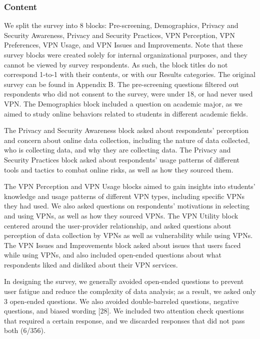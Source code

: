 \subsubsection{Content}

We split the survey into 8 blocks: Pre-screening, Demographics, Privacy and
Security Awareness, Privacy and Security Practices, VPN Perception, VPN
Preferences, VPN Usage, and VPN Issues and Improvements. Note that these
survey blocks were created solely for internal organizational purposes, and
they cannot be viewed by survey respondents. As such, the block titles do not
correspond 1-to-1 with their contents, or with our Results categories. The
original survey can be found in Appendix B.  The pre-screening questions
filtered out respondents who did not consent to the survey, were under 18, or
had never used VPN. The Demographics block included a question on academic
major, as we aimed to study online behaviors related to students in different
academic fields.

The Privacy and Security Awareness block asked about respondents' perception
and concern about online data collection, including the nature of data
collected, who is collecting data, and why they are collecting data. The
Privacy and Security Practices block asked about respondents' usage patterns
of different tools and tactics to combat online risks, as well as how they
sourced them.

The VPN Perception and VPN Usage blocks aimed to gain insights into students’
knowledge and usage patterns of different VPN types, including specific VPNs
they had used. We also asked questions on respondents’ motivations in
selecting and using VPNs, as well as how they sourced VPNs. The VPN Utility
block centered around the user-provider relationship, and asked questions
about perception of data collection by VPNs as well as vulnerability while
using VPNs. The VPN Issues and Improvements block asked about issues that
users faced while using VPNs, and also included open-ended questions about
what respondents liked and disliked about their VPN services.

In designing the survey, we generally avoided open-ended questions to prevent
user fatigue and reduce the complexity of data analysis; as a result, we asked
only 3 open-ended questions. We also avoided double-barreled questions,
negative questions, and biased wording [28]. We included two attention check
questions that required a certain response, and we discarded responses that
did not pass both (6/356).

